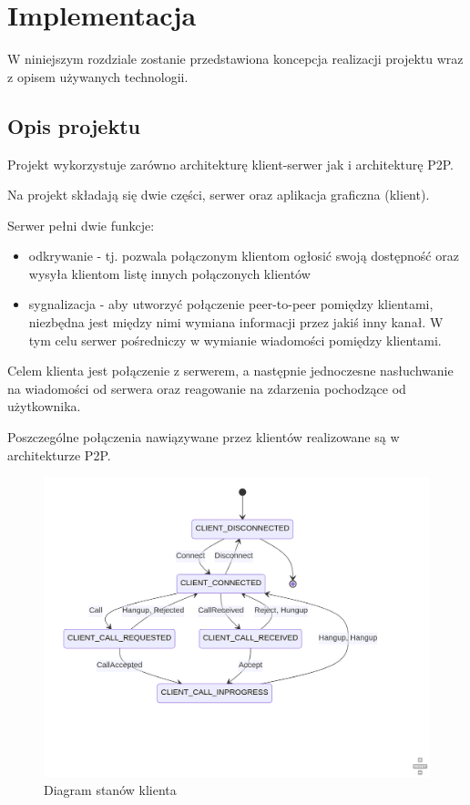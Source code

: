 \chapter{Implementacja}

W niniejszym rozdziale zostanie przedstawiona koncepcja realizacji projektu wraz z opisem używanych
technologii.

\section{Opis projektu}

Projekt wykorzystuje zarówno architekturę klient-serwer jak i architekturę P2P.

Na projekt składają się dwie części, serwer oraz aplikacja graficzna (klient).

Serwer pełni dwie funkcje:

\begin{itemize}
	\item odkrywanie - tj. pozwala połączonym klientom ogłosić swoją dostępność oraz wysyła klientom
	      listę innych połączonych klientów
	\item sygnalizacja - aby utworzyć połączenie peer-to-peer pomiędzy klientami, niezbędna jest
	      między nimi wymiana informacji przez jakiś inny kanał. W tym celu serwer pośredniczy w wymianie
	      wiadomości pomiędzy klientami.
\end{itemize}

Celem klienta jest połączenie z serwerem, a następnie jednoczesne nasłuchwanie na wiadomości od
serwera oraz reagowanie na zdarzenia pochodzące od użytkownika.

Poszczególne połączenia nawiązywane przez klientów realizowane są w architekturze P2P.

\begin{figure}[H]
	\centering
	\includegraphics[width=.8\textwidth]{img/rozdzial3/state-diagram-2}
	\caption{Diagram stanów klienta}
\end{figure}

